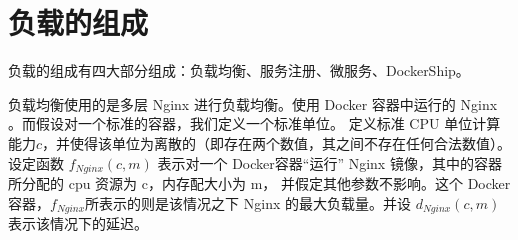 \section{负载的组成}
负载的组成有四大部分组成：负载均衡、服务注册、微服务、DockerShip。

负载均衡使用的是多层 Nginx 进行负载均衡。使用 Docker 容器中运行的 Nginx 。而假设对一个标准的容器，我们定义一个标准单位。
定义标准 CPU 单位计算能力$c$，并使得该单位为离散的（即存在两个数值，其之间不存在任何合法数值）。设定函数
$f_{Nginx}(c,m)$ 表示对一个 Docker容器“运行” Nginx 镜像，其中的容器所分配的 cpu 资源为 c，内存配大小为 m，
并假定其他参数不影响。这个 Docker 容器，$f_{Nginx}$所表示的则是该情况之下 Nginx 的最大负载量。并设 $d_{Nginx}(c,m)$ 表示该情况下的延迟。
